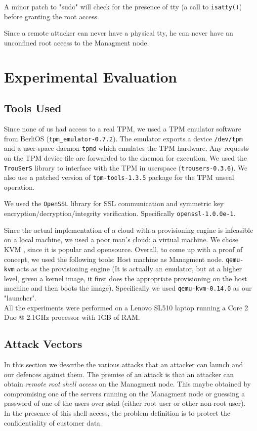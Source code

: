 \documentclass[10pt,twocolumn,pdftex]{article}
\begin{document}
A minor patch to "sudo" will check for the presence of tty (a call to {\tt isatty()}) before granting the root access. 

Since a remote attacker can never have a physical tty, he can never have an unconfined root access to the Managment node.

\section{Experimental Evaluation}
\label{sec:evaluation}

\subsection{Tools Used}
Since none of us had access to a real TPM, we used a TPM emulator software from BerliOS ({\tt tpm\_emulator-0.7.2}). The emulator exports a device {\tt /dev/tpm} and a user-space daemon {\tt tpmd} which emulates the TPM hardware. Any requests on the TPM device file are forwarded to the daemon for execution. We used the {\tt TrouSerS} library to interface with the TPM in userspace ({\tt trousers-0.3.6}). We also use a patched version of {\tt tpm-tools-1.3.5} package for the TPM unseal operation.

We used the {\tt OpenSSL} library for SSL communication and symmetric key encryption/decryption/integrity verification. Specifically {\tt openssl-1.0.0e-1}. 

Since the actual implementation of a cloud with a provisioning engine is infeasible on a local machine, we used a poor man's cloud: a virtual machine. We chose KVM \cite{KVM}, since it is popular and opensource. Overall, to come up with a proof of concept, we used the following tools: Host machine as Managment node. {\tt qemu-kvm} acts as the provisioning engine (It is actually an emulator, but at a higher level, given a kernel image, it first does the appropriate provisioning on the host machine and then boots the image). Specifically we used {\tt qemu-kvm-0.14.0} as our "launcher". \\

All the experiments were performed on a Lenovo SL510 laptop running a Core 2 Duo @ 2.1GHz processor with 1GB of RAM. 

\subsection{Attack Vectors}
In this section we describe the various attacks that an attacker can launch and our defences against them. The premise of an attack is that an attacker can obtain \emph{remote root shell access} on the Managment node. This maybe obtained by compromising one of the servers running on the Managment node or guessing a password of one of the users over sshd (either root user or other non-root user). In the presence of this shell access, the problem definition is to protect the confidentiality of customer data.
\end{document}
